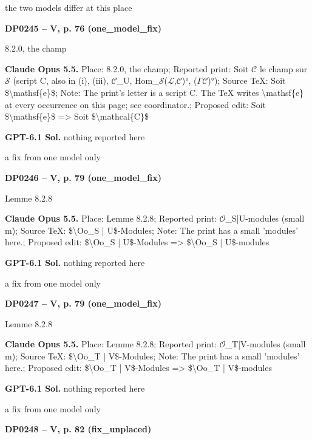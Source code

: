 the two models differ at this place\par
\par\noindent\hypertarget{DP0245}{}\textbf{DP0245 -- V, p. 76 (one\_model\_fix)}\par
8.2.0, the champ\par
\textbf{Claude Opus 5.5.} Place: 8.2.0, the champ; Reported print: Soit \ensuremath{𝒞} le champ sur \ensuremath{𝒮} (script C, also in (i), (iii), \ensuremath{𝒞}\_U, Hom\_\ensuremath{𝒮}(\ensuremath{\mathcal{L}},\ensuremath{𝒞})°, (\ensuremath{\Gamma}\ensuremath{𝒞})°); Source TeX: Soit \$\textbackslash{}mathsf\{e\}\$; Note: The print's letter is a script C. The TeX writes \textbackslash{}mathsf\{e\} at every occurrence on this page; see coordinator.; Proposed edit: Soit \$\textbackslash{}mathsf\{e\}\$ =\allowbreak > Soit \$\textbackslash{}mathcal\{C\}\$\par
\textbf{GPT-6.1 Sol.} nothing reported here\par
a fix from one model only\par
\par\noindent\hypertarget{DP0246}{}\textbf{DP0246 -- V, p. 79 (one\_model\_fix)}\par
Lemme 8.2.8\par
\textbf{Claude Opus 5.5.} Place: Lemme 8.2.8; Reported print: \ensuremath{𝒪}\_S|U-modules (small m); Source TeX: \$\textbackslash{}Oo\_S | U\$-Modules; Note: The print has a small 'modules' here.; Proposed edit: \$\textbackslash{}Oo\_S | U\$-Modules =\allowbreak > \$\textbackslash{}Oo\_S | U\$-modules\par
\textbf{GPT-6.1 Sol.} nothing reported here\par
a fix from one model only\par
\par\noindent\hypertarget{DP0247}{}\textbf{DP0247 -- V, p. 79 (one\_model\_fix)}\par
Lemme 8.2.8\par
\textbf{Claude Opus 5.5.} Place: Lemme 8.2.8; Reported print: \ensuremath{𝒪}\_T|V-modules (small m); Source TeX: \$\textbackslash{}Oo\_T | V\$-Modules; Note: The print has a small 'modules' here.; Proposed edit: \$\textbackslash{}Oo\_T | V\$-Modules =\allowbreak > \$\textbackslash{}Oo\_T | V\$-modules\par
\textbf{GPT-6.1 Sol.} nothing reported here\par
a fix from one model only\par
\par\noindent\hypertarget{DP0248}{}\textbf{DP0248 -- V, p. 82 (fix\_unplaced)}\par
